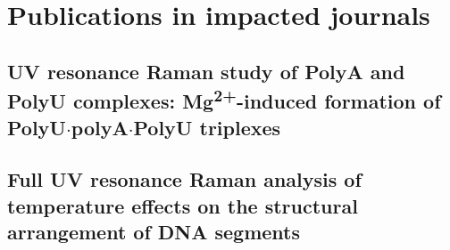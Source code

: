 \chapter{Publications in impacted journals}


\section[\texorpdfstring{%
	UV resonance Raman study of PolyA and PolyU complexes:\\
	Mg\textsuperscript{2+}\babelhyphen{nobreak}induced formation of
	PolyU$\cdot$polyA$\cdot$PolyU triplexes
}{%
	UV resonance Raman study of PolyA and PolyU complexes:
	Mg\texttwosuperior\textplussuperior-induced formation of PolyU·polyA·PolyU
	triplexes
}]{%
	UV resonance Raman study of PolyA and PolyU complexes:
	Mg\textsuperscript{2+}-induced formation of PolyU$\cdot$polyA$\cdot$PolyU
	triplexes
}%


\section[\texorpdfstring{%
	Full UV resonance Raman analysis of temperature effects on the structural
	arrangement of DNA segments
}{%
	Full UV resonance Raman analysis of temperature effects on the structural
	arrangement of DNA segments
}]{%
	Full UV resonance Raman analysis of temperature effects on the structural
	arrangement of DNA segments
}%
